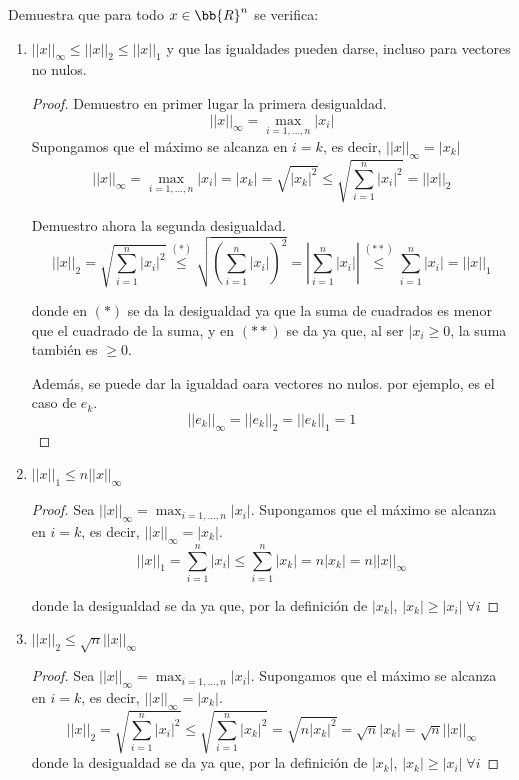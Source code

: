 \begin{ejercicio} Demuestra que para todo $x\in \bb{R}^n$ se verifica:
    \begin{enumerate}
        \item  $ ||x||_\infty \leq ||x||_2 \leq ||x||_1 $ \qquad y que las igualdades pueden darse, incluso para vectores no nulos.
        \begin{proof}
            Demuestro en primer lugar la primera desigualdad.
            $$ ||x||_\infty = \max_{i=1,\dots,n} |x_i|$$
            Supongamos que el máximo se alcanza en $i=k$, es decir, $||x||_\infty = |x_k|$
            $$||x||_\infty = \max_{i=1,\dots,n} |x_i| = |x_k| = \sqrt{|x_k|^2}\leq \sqrt{\sum_{i=1}^n |x_i|^2} = ||x||_2$$

            Demuestro ahora la segunda desigualdad.
            $$||x||_2 = \sqrt{\sum_{i=1}^n |x_i|^2} \stackrel{(\ast)}{\leq} \sqrt{\left(\sum_{i=1}^n |x_i|\right)^2} = \left|\sum_{i=1}^n |x_i|\right| \stackrel{(\ast \ast)}{\leq} \sum_{i=1}^n |x_i| = ||x||_1$$

            donde en $(\ast)$ se da la desigualdad ya que la suma de cuadrados es menor que el cuadrado de la suma, y en $(\ast \ast)$ se da ya que, al ser $|x_i \geq 0$, la suma también es $\geq 0$.

            Además, se puede dar la igualdad oara vectores no nulos. por ejemplo, es el caso de $e_k$.
            $$ ||e_k||_\infty = ||e_k||_2 = ||e_k||_1 = 1 $$
        \end{proof}

        \item $||x||_1 \leq n||x||_\infty$

        \begin{proof}
            Sea $||x||_\infty = \max_{i=1,\dots,n}|x_i|$. Supongamos que el máximo se alcanza en $i=k$, es decir, $||x||_\infty = |x_k|$.
            $$||x||_1 = \sum_{i=1}^n |x_i| \leq \sum_{i=1}^n |x_k| = n|x_k| = n||x||_\infty$$
    
            donde la desigualdad se da ya que, por la definición de $|x_k|$, $|x_k|\geq |x_i| \; \forall i$
        \end{proof}

        \item $||x||_2 \leq \sqrt{n}||x||_\infty$

        \begin{proof}
            Sea $||x||_\infty = \max_{i=1,\dots,n}|x_i|$. Supongamos que el máximo se alcanza en $i=k$, es decir, $||x||_\infty = |x_k|$.
            $$||x||_2 = \sqrt{\sum_{i=1}^n |x_i|^2} \leq \sqrt{\sum_{i=1}^n |x_k|^2} = \sqrt{n |x_k|^2} = \sqrt{n}|x_k| = \sqrt{n}||x||_\infty$$
            donde la desigualdad se da ya que, por la definición de $|x_k|$, $|x_k|\geq |x_i| \; \forall i$
        \end{proof}
    \end{enumerate}
\end{ejercicio}

